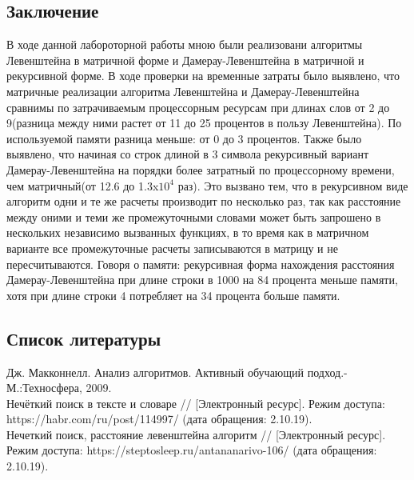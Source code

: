 \documentclass[a4paper,12pt]{report}
\begin{document}
    \begin{center}
    	\newpage
        \section*{Заключение}
        
        \begin{flushleft}
        В ходе данной лабороторной работы мною были реализовани алгоритмы Левенштейна в матричной форме и Дамерау-Левенштейна в матричной и рекурсивной форме. В ходе проверки на временные затраты было выявлено, что матричные реализации алгоритма Левенштейна и Дамерау-Левенштейна сравнимы по затрачиваемым процессорным ресурсам при длинах слов от 2 до 9(разница между ними растет от 11 до 25 процентов в пользу Левенштейна). По используемой памяти разница меньше: от 0 до 3 процентов. Также было выявлено, что начиная со строк длиной в 3 символа рекурсивный вариант Дамерау-Левенштейна на порядки более затратный по процессорному времени, чем матричный(от 12.6 до 1.3x$10^4$ раз). Это вызвано тем, что в рекурсивном виде алгоритм одни и те же расчеты производит по несколько раз, так как расстояние между оними и теми же промежуточными словами может быть запрошено в нескольких независимо вызванных функциях, в то время как в матричном варианте все промежуточные расчеты записываются в матрицу и не пересчитываются. Говоря о памяти: рекурсивная форма нахождения расстояния Дамерау-Левенштейна при длине строки в 1000 на 84 процента меньше памяти, хотя при длине строки 4 потребляет на 34 процента больше памяти.
        \end{flushleft}
    \end{center}

    \begin{center}
    	\newpage
        \section*{Список литературы}
        \begin{flushleft}
        Дж. Макконнелл. Анализ алгоритмов. Активный обучающий подход.-М.:Техносфера, 2009.\\
        
Нечёткий поиск в тексте и словаре // [Электронный ресурс]. Режим доступа: https://habr.com/ru/post/114997/ (дата обращения: 2.10.19).\\

Нечеткий поиск, расстояние левенштейна алгоритм // [Электронный ресурс]. Режим доступа: https://steptosleep.ru/antananarivo-106/ (дата обращения: 2.10.19).
        \end{flushleft}
    \end{center}        
\end{document}
